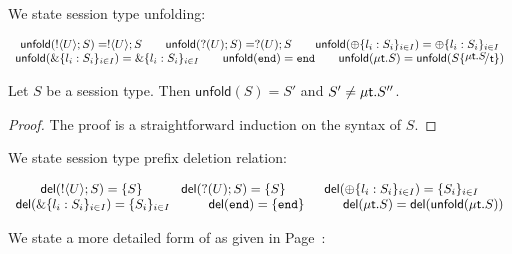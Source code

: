 

\newcommand{\delete}[1]{\mathsf{del}(#1)}
\newcommand{\unfold}[1]{\mathsf{unfold}(#1)}
We state session type unfolding:
\begin{definition}
	\[
	\begin{array}{c}
		\unfold{\btout{U} S} = \btout{U} S
		\qquad
		\unfold{\btinp{U} S} = \btinp{U} S
		\qquad
		\unfold{\btsel{l_i: S_i}_{i \in I}} = \btsel{l_i: S_i}_{i \in I}
		\\
		\unfold{\btbra{l_i: S_i}_{i \in I}} = \btbra{l_i: S_i}_{i \in I}
		\qquad 
		\unfold{\tinact} = \tinact
		\qquad
		\unfold{\trec{t}{S}} = \unfold{S \subst{\trec{t}{S}}{\tvar{t}}  }
	\end{array}
	\]
\end{definition}

\begin{lemma}
	Let $S$ be a session type. Then $\unfold{S} = S'$ and
	$S' \not= \mu\mathsf{t}.S''$.
\end{lemma}

\begin{proof}
	The proof is a straightforward induction on the syntax of $S$.
\end{proof}

We state session type prefix deletion relation:
\begin{definition} 
	\[
	\begin{array}{c}
		\delete{\btout{U} S} = \set{S}
		\qquad \quad
		\delete{\btinp{U} S} = \set{S}
		\qquad \quad
		\delete{\btsel{l_i: S_i}_{i \in I}} = \set{S_i}_{i \in I}
		\\
		\delete{\btbra{l_i: S_i}_{i \in I}} = \set{S_i}_{i \in I}
		\qquad \quad
		\delete{\tinact} = \set{\tinact}
		\qquad \quad
		\delete{\trec{t}{S}} = \delete{\unfold{\trec{t}{S}}}
	\end{array}
	\]
\end{definition}

\label{app:inhabit}

We state a more detailed form of  as given in Page~\pageref{p:inhabit}:

